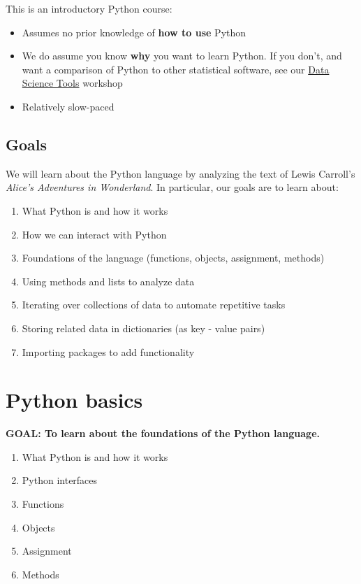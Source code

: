 \documentclass[
]{book}
\providecommand{\tightlist}{%
  \setlength{\itemsep}{0pt}\setlength{\parskip}{0pt}}
\begin{document}
This is an introductory Python course:

\begin{itemize}
\tightlist
\item
  Assumes no prior knowledge of \textbf{how to use} Python
\item
  We do assume you know \textbf{why} you want to learn Python. If you don't, and want a comparison of Python to other statistical software, see our \href{./DataScienceTools.html}{Data Science Tools} workshop
\item
  Relatively slow-paced
\end{itemize}

\hypertarget{goals-3}{%
\subsection{Goals}\label{goals-3}}

\begin{alert}

We will learn about the Python language by analyzing the text of Lewis Carroll's \emph{Alice's Adventures in Wonderland}.
In particular, our goals are to learn about:

\begin{enumerate}
\def\labelenumi{\arabic{enumi}.}
\tightlist
\item
  What Python is and how it works
\item
  How we can interact with Python
\item
  Foundations of the language (functions, objects, assignment, methods)
\item
  Using methods and lists to analyze data
\item
  Iterating over collections of data to automate repetitive tasks
\item
  Storing related data in dictionaries (as key - value pairs)
\item
  Importing packages to add functionality
\end{enumerate}

\end{alert}

\hypertarget{python-basics}{%
\section{Python basics}\label{python-basics}}

\begin{alert}

\textbf{GOAL: To learn about the foundations of the Python language.}

\begin{enumerate}
\def\labelenumi{\arabic{enumi}.}
\tightlist
\item
  What Python is and how it works
\item
  Python interfaces
\item
  Functions
\item
  Objects
\item
  Assignment
\item
  Methods
\end{enumerate}

\end{alert}
\end{document}
